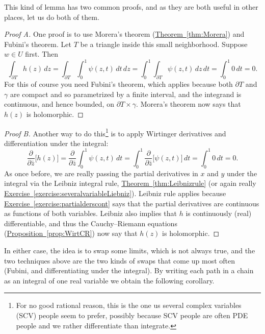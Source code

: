 \documentclass[12pt,openany]{book}
\theoremstyle{plain}
\theoremstyle{remark}
\theoremstyle{definition}
\theoremstyle{exercise}
\theoremstyle{example}
\newcommand{\exerciseref}[1]{\hyperref[#1]{Exercise~\ref*{#1}}}
\newcommand{\thmref}[1]{\hyperref[#1]{Theorem~\ref*{#1}}}
\newcommand{\propref}[1]{\hyperref[#1]{Proposition~\ref*{#1}}}
\begin{document}
This kind of lemma has two common proofs,
and as they are both useful in other places, let us do both of them.

\begin{proof}[Proof A]
One proof is to use Morera's theorem (\thmref{thm:Morera}) and Fubini's theorem.
Let $T$ be a triangle inside this small neighborhood.  Suppose $w \in U$
first.  Then
\begin{equation*}
\int_{\partial T}
h(z)
\, dz
=
\int_{\partial T}
\int_0^1 \psi(z,t) \, dt
\, dz
=
\int_0^1
\int_{\partial T}
\psi(z,t)
\, dz
\, dt
= \int_0^1 0 \, dt = 0.
\end{equation*}
For this of course you need Fubini's theorem, which applies because both
$\partial T$ and $\gamma$ are compact and so parametrized by a finite
interval, and the integrand is continuous, and hence bounded,
on $\partial T \times \gamma$.
Morera's theorem now says that $h(z)$ is
holomorphic.
\end{proof}

\begin{proof}[Proof B]
Another way to do this\footnote{%
For no good rational reason, this is the one us several complex variables
(SCV) people seem to prefer, possibly because SCV people are often PDE
people and we rather differentiate than integrate.}
is to apply Wirtinger derivatives and differentiation under the integral:
\begin{equation*}
\frac{\partial}{\partial \bar{z}}
\bigl[
h(z)
\bigr]
=
\frac{\partial}{\partial \bar{z}}
\int_0^1 \psi(z,t) \, dt
=
\int_0^1
\frac{\partial}{\partial \bar{z}}
\bigl[
\psi(z,t)
\bigr]
\, dt
= \int_0^1 0 \, dt = 0.
\end{equation*}
As once before, we are really passing the partial derivatives in $x$
and $y$ under the integral via the Leibniz integral rule,
\thmref{thm:Leibnizrule} (or again really
\exerciseref{exercise:severalvariableLiebniz}).
Leibniz rule applies because 
\exerciseref{exercise:partialderscont} says that the partial
derivatives are continuous as functions of both variables.
Leibniz also implies that $h$ is continuously (real) differentiable,
and thus
the Cauchy--Riemann equations
(\propref{prop:WirtCR}) now
say that $h(z)$ is holomorphic.
\end{proof}

In either case, the idea is to swap some limits, which is not always true,
and the two techniques above are the two kinds of swaps that come up most
often (Fubini, and differentiating under the integral).  By writing each
path in a chain as an integral of one real variable we obtain the following
corollary.
\end{document}
